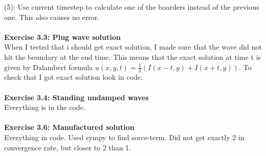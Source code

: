 \documentclass[11pt,a4paper]{report}
\begin{document}
(5): Use current timestep to calculate one of the boarders instead of the previous one. This also causes no error.
\\
\\
\textbf{Exercise 3.3: Plug wave solution}
\\
When I tested that i should get exact solution, I made sure that the wave did not hit the boundary at the end time. This means that the exact solution at time t is given by Dalambert formula $u(x,y,t)=\frac{1}{2}(I(x-t,y)+I(x+t,y))$. To check that I got exact solution look in code.
\\
\\
\textbf{Exercise 3.4: Standing undamped waves}
\\
Everything is in the code.
\\
\\
\textbf{Exercise 3.6: Manufactured solution}
\\
Everything in code. Used sympy to find sorce-term. Did not get exactly 2 in convergence rate, but closer to 2 than 1.
\end{document}
